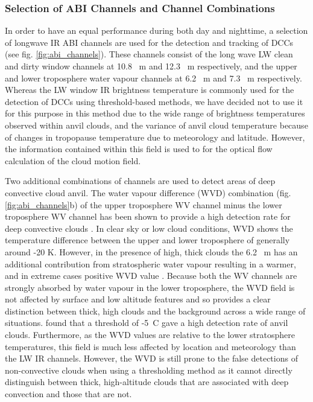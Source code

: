 \subsubsection{Selection of ABI Channels and Channel Combinations}

In order to have an equal performance during both day and nighttime, a selection of longwave IR ABI channels are used for the detection and tracking of DCCs (see fig. \ref{fig:abi_channels}). 
These channels consist of the long wave LW clean and dirty window channels at 10.8 \unit{\mu m} and 12.3 \unit{\mu m} respectively, and the upper and lower troposphere water vapour channels at 6.2 \unit{\mu m} and 7.3 \unit{\mu m} respectively.
Whereas the LW window IR brightness temperature is commonly used for the detection of DCCs using threshold-based methods, we have decided not to use it for this purpose in this method due to the wide range of brightness temperatures observed within anvil clouds, and the variance of anvil cloud temperature because of changes in tropopause temperature due to meteorology and latitude.
However, the information contained within this field is used to for the optical flow calculation of the cloud motion field.

Two additional combinations of channels are used to detect areas of deep convective cloud anvil. 
The water vapour difference (WVD) combination (fig. \ref{fig:abi_channels}b) of the upper troposphere WV channel minus the lower troposphere WV channel has been shown to provide a high detection rate for deep convective clouds \citep{muller_role_2018, muller_novel_2019}.
In clear sky or low cloud conditions, WVD shows the temperature difference between the upper and lower troposphere of generally around -20 K. 
However, in the presence of high, thick clouds the 6.2 \unit{\mu m} has an additional contribution from stratospheric water vapour resulting in a warmer, and in extreme cases positive WVD value \citep{schmetz_monitoring_1997}.
Because both the WV channels are strongly absorbed by water vapour in the lower troposphere, the WVD field is not affected by surface and low altitude features and so provides a clear distinction between thick, high clouds and the background across a wide range of situations.
\citet{muller_novel_2019} found that a threshold of -5~\textdegree C gave a high detection rate of anvil clouds.
Furthermore, as the WVD values are relative to the lower stratosphere temperatures, this field is much less affected by location and meteorology than the LW IR channels.
However, the WVD is still prone to the false detections of non-convective clouds when using a thresholding method as it cannot directly distinguish between thick, high-altitude clouds that are associated with deep convection and those that are not.

